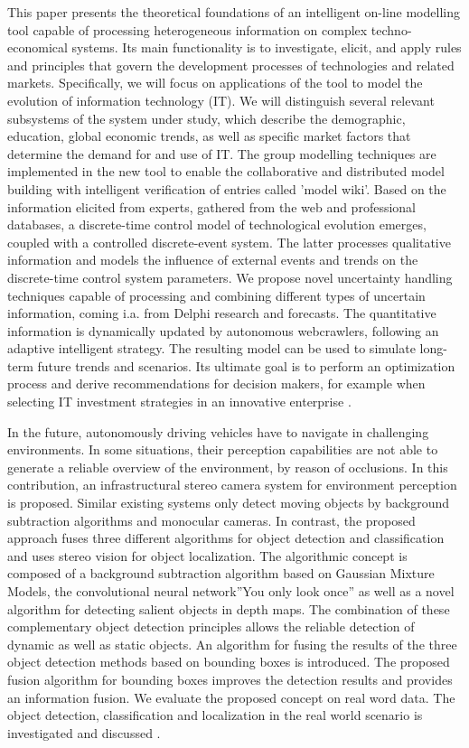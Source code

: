 This paper presents the theoretical foundations of an intelligent on-line modelling tool capable of processing heterogeneous information on complex techno-economical systems. Its main functionality is to investigate, elicit, and apply rules and principles that govern the development processes of technologies and related markets. Specifically, we will focus on applications of the tool to model the evolution of information technology (IT). We will distinguish several relevant subsystems of the system under study, which describe the demographic, education, global economic trends, as well as specific market factors that determine the demand for and use of IT. The group modelling techniques are implemented in the new tool to enable the collaborative and distributed model building with intelligent verification of entries called 'model wiki'. Based on the information elicited from experts, gathered from the web and professional databases, a discrete-time control model of technological evolution emerges, coupled with a controlled discrete-event system. The latter processes qualitative information and models the influence of external events and trends on the discrete-time control system parameters. We propose novel uncertainty handling techniques capable of processing and combining different types of uncertain information, coming i.a. from Delphi research and forecasts. The quantitative information is dynamically updated by autonomous webcrawlers, following an adaptive intelligent strategy. The resulting model can be used to simulate long-term future trends and scenarios. Its ultimate goal is to perform an optimization process and derive recommendations for decision makers, for example when selecting IT investment strategies in an innovative enterprise \cite{Skulimowski2012}.

In the future, autonomously driving vehicles have to navigate in challenging environments. In some situations, their perception capabilities are not able to generate a reliable overview of the environment, by reason of occlusions. In this contribution, an infrastructural stereo camera system for environment perception is proposed. Similar existing systems only detect moving objects by background subtraction algorithms and monocular cameras. In contrast, the proposed approach fuses three different algorithms for object detection and classification and uses stereo vision for object localization. The algorithmic concept is composed of a background subtraction algorithm based on Gaussian Mixture Models, the convolutional neural network”You only look once” as well as a novel algorithm for detecting salient objects in depth maps. The combination of these complementary object detection principles allows the reliable detection of dynamic as well as static objects. An algorithm for fusing the results of the three object detection methods based on bounding boxes is introduced. The proposed fusion algorithm for bounding boxes improves the detection results and provides an information fusion. We evaluate the proposed concept on real word data. The object detection, classification and localization in the real world scenario is investigated and discussed \cite{Hofmann2019}.